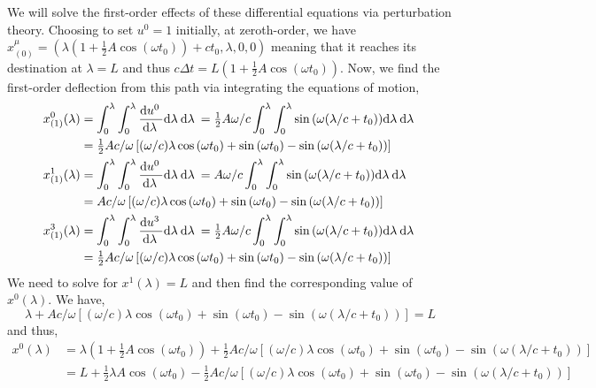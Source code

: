 \documentclass[12pt]{article}
\begin{document}
We will solve the first-order effects of these differential equations via perturbation theory. Choosing to set $u^0 = 1$ initially, at zeroth-order, we have $x_{(0)}^\mu = (\lambda (1 + \tfrac{1}{2} A \cos{(\omega t_0)}) + c t_0, \lambda , 0, 0)$ meaning that it reaches its destination at $\lambda = L$ and thus $c \Delta t = L (1 + \tfrac{1}{2} A \cos{(\omega t_0)})$. Now, we find the first-order deflection from this path via integrating the equations of motion,
\begin{align*}
x_{(1)}^0(\lambda) & = \int_0^\lambda \int_0^\lambda \frac{\mathrm{d}u^0 \:}{\mathrm{d}\lambda \:} \mathrm{d}\lambda \: \mathrm{d}\lambda \: = \tfrac{1}{2} A \omega/c \int_0^\lambda \int_0^\lambda \sin{(\omega (\lambda / c + t_0))} \mathrm{d}\lambda \: \mathrm{d}\lambda \:
\\
& = \tfrac{1}{2} A c/\omega \left[(\omega / c) \lambda \cos{(\omega t_0)} + \sin{(\omega t_0)}  - \sin{(\omega (\lambda / c + t_0))} \right]
\\
x_{(1)}^1(\lambda) & = \int_0^\lambda \int_0^\lambda \frac{\mathrm{d}u^0 \:}{\mathrm{d}\lambda \:} \mathrm{d}\lambda \: \mathrm{d}\lambda \: = A \omega/c \int_0^\lambda \int_0^\lambda \sin{(\omega (\lambda / c + t_0))} \mathrm{d}\lambda \: \mathrm{d}\lambda \:
\\
& =  A c/\omega  \left[(\omega / c) \lambda \cos{(\omega t_0)} + \sin{(\omega t_0)}  - \sin{(\omega (\lambda / c + t_0))} \right]
\\
x_{(1)}^3(\lambda) & = \int_0^\lambda \int_0^\lambda \frac{\mathrm{d}u^3 \:}{\mathrm{d}\lambda \:} \mathrm{d}\lambda \: \mathrm{d}\lambda \: = \tfrac{1}{2} A \omega/c \int_0^\lambda \int_0^\lambda \sin{(\omega (\lambda / c + t_0))} \mathrm{d}\lambda \: \mathrm{d}\lambda \:
\\
& = \tfrac{1}{2} A c/\omega  \left[(\omega / c) \lambda \cos{(\omega t_0)} + \sin{(\omega t_0)}  - \sin{(\omega (\lambda / c + t_0))} \right]
\end{align*}
We need to solve for $x^1(\lambda) = L$ and then find the corresponding value of $x^0(\lambda)$. We have,
\[ \lambda +  A c/\omega \left[(\omega / c) \lambda \cos{(\omega t_0)} + \sin{(\omega t_0)}  - \sin{(\omega (\lambda / c + t_0))} \right] = L \]
and thus,
\begin{align*}
x^0(\lambda) & = \lambda (1 + \tfrac{1}{2} A \cos{(\omega t_0)}) +  \tfrac{1}{2}  A c/\omega  \left[ (  \omega / c) \lambda \cos{(\omega t_0)} + \sin{(\omega t_0)}  - \sin{(\omega (\lambda / c + t_0))} \right]
\\
& = L + \tfrac{1}{2} \lambda  A \cos{(\omega t_0)} - \tfrac{1}{2}  A c/\omega  \left[ (  \omega / c) \lambda \cos{(\omega t_0)} + \sin{(\omega t_0)}  - \sin{(\omega (\lambda / c + t_0))} \right]
\end{align*}
\end{document}
